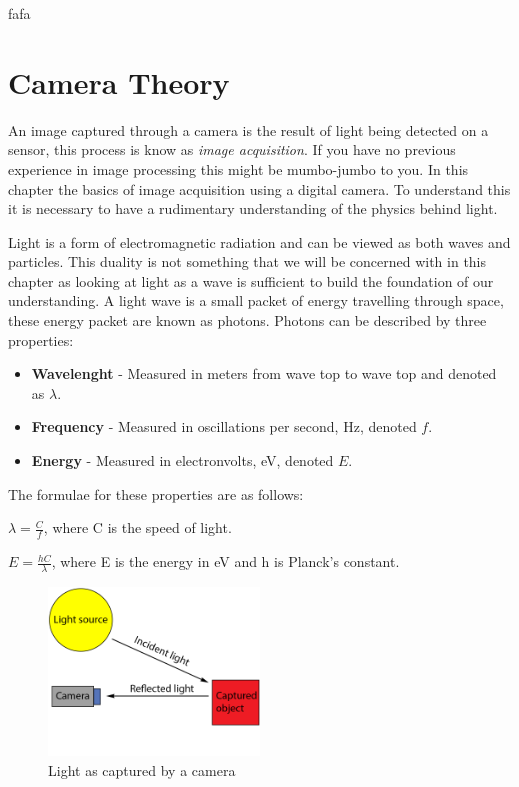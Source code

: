 fafa\section{Camera Theory}

An image captured through a camera is the result of light being detected on a sensor, this process is know as \textit{image acquisition}. If you have no previous experience in image processing this might be mumbo-jumbo to you. In this chapter the basics of image acquisition using a digital camera. To understand this it is necessary to have a rudimentary understanding of the physics behind light.

Light is a form of electromagnetic radiation and can be viewed as both waves and particles. This duality is not something that we will be concerned with in this chapter as looking at light as a wave is sufficient to build the foundation of our understanding. A light wave is a small packet of energy travelling through space, these energy packet are known as photons. Photons can be described by three properties:

\begin{itemize}
\item \textbf{Wavelenght} - Measured in meters from wave top to wave top and denoted as $\lambda$.
\item \textbf{Frequency} - Measured in oscillations per second, Hz, denoted $f$.
\item \textbf{Energy} - Measured in electronvolts, eV, denoted $E$.
\end{itemize}

The formulae for these properties are as follows:

$\lambda = \frac{C}{f}$, where C is the speed of light.

$E = \frac{hC}{\lambda}$, where E is the energy in eV and h is Planck's constant.

\begin{figure}[htbp] 
\centering 
\includegraphics[width=0.5\textwidth]{Pictures/Theory/light_from_sun.png} 
\caption{Light as captured by a camera} 
\label{fig:light_cam} 
\end{figure} 


